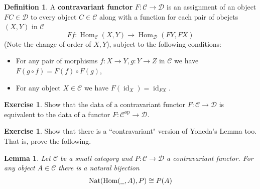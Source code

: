 \documentclass[12pt]{article}
\theoremstyle{plain}
\newtheorem{lemma}[thm]{Lemma}
\theoremstyle{definition}
\newtheorem{defn}[thm]{Definition} %
\newtheorem{exercise}[thm]{Exercise}
\newcommand{\scr}[1]{\mathscr{#1}}
\newcommand{\und}[1]{\underline{\hspace{#1 cm}}}
\newcommand{\lto}{\longrightarrow}
\begin{document}
\begin{defn}
	A \textbf{contravariant functor} $F: \scr{C} \lto \scr{D}$ is an assignment of an object $FC \in \scr{D}$ to every object $C \in \scr{C}$ along with a function for each pair of obejcts $(X,Y)$ in $\scr{C}$
	\begin{equation}
		Ff: \operatorname{Hom}_{\scr{C}}(X, Y) \lto \operatorname{Hom}_{\scr{D}}(FY,FX)
		\end{equation}
	(Note the change of order of $X, Y$), subject to the following conditions:
	\begin{itemize}
		\item For any pair of morphisms $f: X \lto Y, g: Y \lto Z$ in $\scr{C}$ we have $F(g \circ f) = F(f) \circ F(g)$,
		\item For any object $X \in \scr{C}$ we have $F(\operatorname{id}_X) = \operatorname{id}_{FX}$.
		\end{itemize}
	\end{defn}
\begin{exercise}
	Show that the data of a contravariant functor $F: \scr{C} \lto \scr{D}$ is equivalent to the data of a functor $F: \scr{C}^{\operatorname{op}} \lto \scr{D}$.
	\end{exercise}

\begin{exercise}
	Show that there is a ``contravariant" version of Yoneda's Lemma too. That is, prove the following.
	\begin{lemma}
		Let $\scr{C}$ be a small category and $P: \scr{C} \lto \scr{D}$ a contravariant functor. For any object $A \in \scr{C}$ there is a natural bijection
		\begin{align*}
			\operatorname{Nat}(\operatorname{Hom}(\und{0.2}, A), P) \cong P(A)
			\end{align*}
		\end{lemma}
\end{exercise}
\end{document}
